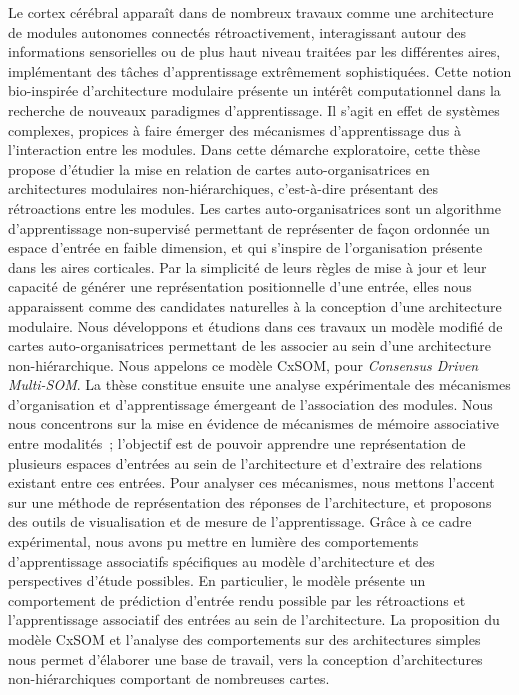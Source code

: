 \documentclass[11pt]{thesul-cs}
\begin{document}
\dominitoc

\begin{ThesisAbstract}
  \begin{FrenchAbstract}
  Le cortex cérébral apparaît dans de nombreux travaux comme une architecture de modules autonomes connectés rétroactivement, interagissant autour des informations sensorielles ou de plus haut niveau traitées par les différentes aires, implémentant des tâches d'apprentissage extrêmement sophistiquées. Cette notion bio-inspirée d'architecture modulaire présente un intérêt computationnel dans la recherche de nouveaux paradigmes d'apprentissage. Il s'agit en effet de systèmes complexes, propices à faire émerger des mécanismes d'apprentissage dus à l'interaction entre les modules.
  Dans cette démarche exploratoire, cette thèse propose d'étudier la mise en relation de cartes auto-organisatrices en architectures modulaires non-hiérarchiques, c'est-à-dire présentant des rétroactions entre les modules.
  Les cartes auto-organisatrices sont un algorithme d'apprentissage non-supervisé permettant de représenter de façon ordonnée un espace d'entrée en faible dimension, et qui s'inspire de l'organisation présente dans les aires corticales. 
  Par la simplicité de leurs règles de mise à jour et leur capacité de générer une représentation positionnelle d'une entrée, elles nous apparaissent comme des candidates naturelles à la conception d'une architecture modulaire.
  Nous développons et étudions dans ces travaux un modèle modifié de cartes auto-organisatrices permettant de les associer au sein d'une architecture non-hiérarchique. Nous appelons ce modèle CxSOM, pour \emph{Consensus Driven Multi-SOM}.
  La thèse constitue ensuite une analyse expérimentale des mécanismes d'organisation et d'apprentissage émergeant de l'association des modules. Nous nous concentrons sur la mise en évidence de mécanismes de mémoire associative entre modalités~; l'objectif est de pouvoir apprendre une représentation de plusieurs espaces d'entrées au sein de l'architecture et d'extraire des relations existant entre ces entrées.
  Pour analyser ces mécanismes, nous mettons l'accent sur une méthode de représentation des réponses de l'architecture, et proposons des outils de visualisation et de mesure de l'apprentissage. Grâce à ce cadre expérimental, nous avons pu mettre en lumière des comportements d'apprentissage associatifs spécifiques au modèle d'architecture et des perspectives d'étude possibles.
  En particulier, le modèle présente un comportement de prédiction d'entrée rendu possible par les rétroactions et l'apprentissage associatif des entrées au sein de l'architecture.
  La proposition du modèle CxSOM et l'analyse des comportements sur des architectures simples nous permet d'élaborer une base de travail, vers la conception d'architectures non-hiérarchiques comportant de nombreuses cartes.


\end{FrenchAbstract}
\end{ThesisAbstract}
\end{document}
